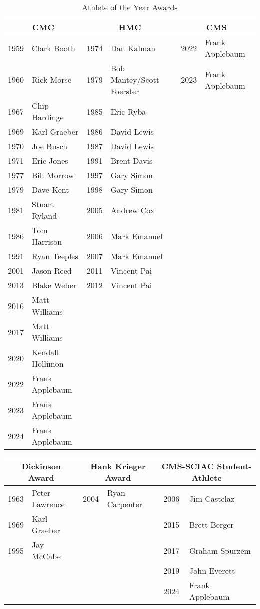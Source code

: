 \begin{table}[htbp]
\centering
\footnotesize
\caption*{Athlete of the Year Awards}
\begin{tabular}{c l | c l | c l}
\toprule
\multicolumn{2}{c|}{\textbf{CMC}} & \multicolumn{2}{c|}{\textbf{HMC}} & \multicolumn{2}{c}{\textbf{CMS}} \\
\midrule
1959 & Clark Booth & 1974 & Dan Kalman & 2022 & Frank Applebaum \\
1960 & Rick Morse & 1979 & Bob Mantey/Scott Foerster & 2023 & Frank Applebaum \\
1967 & Chip Hardinge & 1985 & Eric Ryba & & \\
1969 & Karl Graeber & 1986 & David Lewis & & \\
1970 & Joe Busch & 1987 & David Lewis & & \\
1971 & Eric Jones & 1991 & Brent Davis & & \\
1977 & Bill Morrow & 1997 & Gary Simon & & \\
1979 & Dave Kent & 1998 & Gary Simon & & \\
1981 & Stuart Ryland & 2005 & Andrew Cox & & \\
1986 & Tom Harrison & 2006 & Mark Emanuel & & \\
1991 & Ryan Teeples & 2007 & Mark Emanuel & & \\
2001 & Jason Reed & 2011 & Vincent Pai & & \\
2013 & Blake Weber & 2012 & Vincent Pai & & \\
2016 & Matt Williams & & & & \\
2017 & Matt Williams & & & & \\
2020 & Kendall Hollimon & & & & \\
2022 & Frank Applebaum & & & & \\
2023 & Frank Applebaum & & & & \\
2024 & Frank Applebaum & & & & \\
\bottomrule
\end{tabular}
\end{table}

\begin{table}[htbp]
\centering
\footnotesize
\begin{tabular}{c l | c l | c l}
\toprule
\multicolumn{2}{c|}{\textbf{Dickinson Award}} & \multicolumn{2}{c|}{\textbf{Hank Krieger Award}} & \multicolumn{2}{c}{\textbf{CMS-SCIAC Student-Athlete}} \\
\midrule
1963 & Peter Lawrence & 2004 & Ryan Carpenter & 2006 & Jim Castelaz \\
1969 & Karl Graeber & & & 2015 & Brett Berger \\
1995 & Jay McCabe & & & 2017 & Graham Spurzem \\
& & & & 2019 & John Everett \\
& & & & 2024 & Frank Applebaum \\
\bottomrule
\end{tabular}
\end{table}

